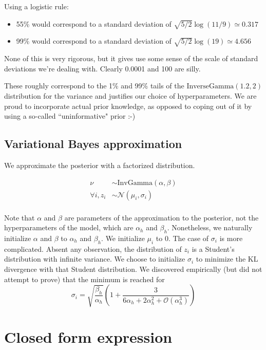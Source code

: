 \documentclass[12pt]{article}
\begin{document}
    Using a logistic rule:
    \begin{itemize}
    \item 55\% would correspond to a standard deviation of $\sqrt{5/2} \log(11/9) \simeq 0.317$
    \item 99\% would correspond to a standard deviation of $\sqrt{5/2} \log(19) \simeq 4.656$
    \end{itemize}

    None of this is very rigorous, but it gives use some sense of the scale
    of standard deviations we're dealing with. Clearly 0.0001 and 100 are silly.

    These roughly correspond to the 1\% and 99\% tails of the
    $\text{InverseGamma}(1.2, 2)$ distribution for the variance and justifies our choice of hyperparameters.
    We are proud to incorporate actual prior knowledge, as opposed
    to coping out of it by using a so-called ``uninformative" prior :-)

\subsection{Variational Bayes approximation}

We approximate the posterior with a factorized distribution.

\begin{equation}
    \begin{aligned}
        \nu &\sim \text{InvGamma}(\alpha, \beta) \\
        \forall i, z_i &\sim \mathcal{N}(\mu_i, \sigma_i) \\
    \end{aligned}
\end{equation}

Note that $\alpha$ and $\beta$ are parameters of the approximation to the posterior, not the hyperparameters of the model, which are
$\alpha_h$ and $\beta_h$. Nonetheless, we naturally initialize $\alpha$ and $\beta$ to $\alpha_h$ and $\beta_h$. We initialize $\mu_i$ to $0$.
The case of $\sigma_i$ is more complicated. Absent any observation, the distribution of $z_i$ is a Student's distribution with
infinite variance. We choose to initialize $\sigma_i$ to minimize the KL divergence with that Student distribution. We discovered
empirically (but did not attempt to prove) that the minimum is reached for
$$\sigma_i = \sqrt{\frac{\beta_h}{\alpha_h}}\left(1 + \frac{3}{6 \alpha_h + 2 \alpha_h^2 + \mathcal{O}(\alpha_h^3)}\right)$$


\section{Closed form expression }
\end{document}
